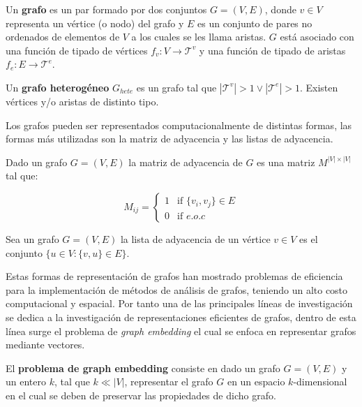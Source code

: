 \begin{definition}
    Un \textbf{grafo} es un par formado por dos conjuntos $G = (V,E)$, 
    donde $v \in V$ representa un v\'ertice (o nodo) del grafo y $E$ es un conjunto
    de pares no ordenados de elementos de $V$ a los cuales se les llama aristas. $G$ est\'a
    asociado con una funci\'on de tipado de v\'ertices $f_v: V \to \mathcal{T}^v$ y 
    una funci\'on de tipado de aristas $f_e : E \to \mathcal{T}^e$. 
\end{definition}

\begin{definition}
    Un \textbf{grafo heterog\'eneo} $G_{hete}$ es un grafo tal 
    que $|\mathcal{T}^v| > 1 \vee |\mathcal{T}^e| > 1$. Existen v\'ertices y/o aristas
    de distinto tipo.
\end{definition}


Los grafos pueden ser representados computacionalmente de distintas formas, las formas
m\'as utilizadas son la matriz de adyacencia y las listas de adyacencia.


\begin{definition}
    Dado un grafo $G = (V,E)$ la matriz de adyacencia de $G$ es una matriz
    $M^{|V|\times|V|}$ tal que:
    
    $$
            M_{ij} =
        \left\{
            \begin{array}{ll}
                1  & \mbox{if } \{v_i, v_j\} \in E \\
                0 & \mbox{if } e.o.c
            \end{array}
        \right.
    $$

\end{definition}


\begin{definition}
    Sea un grafo $G = (V,E)$ la lista de adyacencia de un v\'ertice $v \in V$ es el conjunto
    $\{ u \in V : \{v,u\} \in E \}$.
\end{definition}

Estas formas de representaci\'on de grafos han mostrado problemas de eficiencia
para la implementaci\'on de m\'etodos de an\'alisis de grafos, teniendo un
alto costo computacional y espacial. Por tanto una de las principales l\'ineas de
investigaci\'on se dedica a la investigaci\'on de representaciones eficientes de grafos,
dentro de esta l\'inea surge el problema de \textit{graph embedding} el cual se enfoca en representar
grafos mediante vectores.

\begin{definition}
    El \textbf{problema de graph embedding} consiste en dado un grafo
    $G = (V,E)$ y un entero $k$, tal que $k \ll |V|$, representar el
    grafo $G$ en un espacio $k$-dimensional en el cual se deben de preservar
    las propiedades de dicho grafo.
\end{definition}

